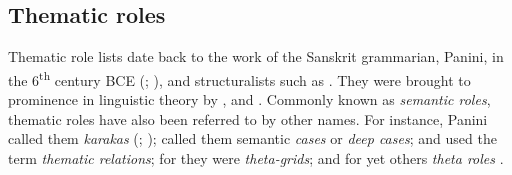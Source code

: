 \documentclass[output=paper]{langsci/langscibook}
\begin{document}
\subsection{Thematic roles}\label{sec:sibanda:2.1}

Thematic role lists date back to the work of the Sanskrit grammarian, Panini, in the 6\textsuperscript{th} century BCE (\citealt[548]{Dowty1991}; \citealt[19--20]{Srikumar2013}), and structuralists such as \citet{Blake1930}. They were brought to prominence in linguistic theory by \citet{Gruber1965,Fillmore1968,Fillmore1977}, and \citet{Jackendoff1972,Jackendoff1976}. Commonly known as \textit{semantic roles}, thematic roles have also been referred to by other names. For instance, Panini called them \textit{karakas} (\citealt[548]{Dowty1991}; \citealt[19-20]{Srikumar2013,Cardona1974}); \citet{Fillmore1968} called them semantic \textit{cases} or \textit{deep cases}; \citet{Gruber1965} and \citet{Jackendoff1972} used the term \textit{thematic relations}; for \citet{Stowell1981} they were \textit{theta-grids}; and for yet others \textit{theta roles} \citep{Chomsky1981,Marantz1984}. 
\end{document}
